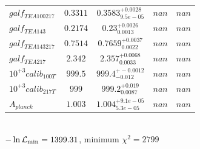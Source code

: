 \begin{tabular}{|l|c|c|c|c|}
$galf_{TE A 100 217 }$ &$0.3311$ & $0.3583_{9.5e-05}^{+0.0028}$ & $nan$ & $nan$ \\ 
$galf_{TE A 143 }$ &$0.2174$ & $0.23_{0.0013}^{+0.0026}$ & $nan$ & $nan$ \\ 
$galf_{TE A 143 217 }$ &$0.7514$ & $0.7659_{0.0022}^{+0.0037}$ & $nan$ & $nan$ \\ 
$galf_{TE A 217 }$ &$2.342$ & $2.357_{0.0033}^{+0.0068}$ & $nan$ & $nan$ \\ 
$10^{+3}calib_{100T }$ &$999.5$ & $999.4_{-0.012}^{+-0.0012}$ & $nan$ & $nan$ \\ 
$10^{+3}calib_{217T }$ &$999$ & $999.2_{0.0087}^{+0.019}$ & $nan$ & $nan$ \\ 
$A_{planck }$ &$1.003$ & $1.004_{5.3e-05}^{+9.1e-05}$ & $nan$ & $nan$ \\ 
\hline 
 \end{tabular} \\ 
$-\ln{\cal L}_\mathrm{min} =1399.31$, minimum $\chi^2=2799$ \\ 
